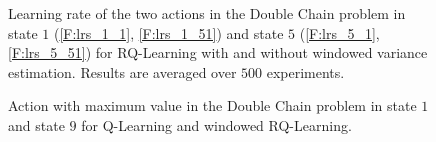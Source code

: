 \begin{figure}[t]
\begin{minipage}{\textwidth}
\end{minipage}
\caption[Learning rate adaptation in double chain problem]{Learning rate of the two actions in the Double Chain problem in state $1$ (\ref{F:lrs_1_1}, \ref{F:lrs_1_51}) and state $5$ (\ref{F:lrs_5_1}, \ref{F:lrs_5_51}) for RQ-Learning with and without windowed variance estimation. Results are averaged over $500$ experiments.}
  \label{F:double_chain_lr}
\end{figure}
\begin{figure}[t]
\begin{minipage}{\textwidth}
\centering
\end{minipage}
\caption[Policy in double chain problem]{Action with maximum value in the Double Chain problem in state $1$ and state $9$ for Q-Learning and windowed RQ-Learning.}
  \label{F:max_a}
\end{figure}
